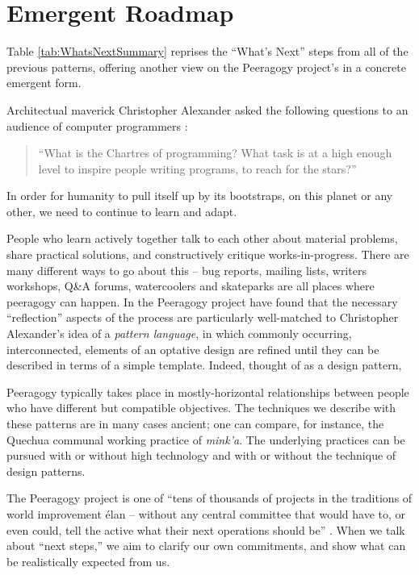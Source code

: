 \section{Emergent Roadmap} \label{sec:Distributed_Roadmap}

Table \ref{tab:WhatsNextSummary} reprises the ``What's Next'' steps from all of the previous
patterns, offering another view on the Peeragogy project's
 in a concrete emergent form.

Architectual maverick Christopher Alexander asked the following questions to an audience of computer programmers \cite{alexander1999origins}: 
\begin{quote}
``What is the Chartres of programming? What task is at a high enough level to inspire people writing programs, to reach for the stars?''
\end{quote}
In order for humanity to pull itself up by its bootstraps, on this planet or any other, we need to continue to learn and adapt.

People who learn actively together talk to each other about material problems, share practical solutions, and constructively critique works-in-progress.  There are many different ways to go about this -- bug reports, mailing lists, writers workshops, Q\&A forums, watercoolers and skateparks are all places where peeragogy can happen.  In the Peeragogy project have found that the necessary ``reflection'' aspects of the process are particularly well-matched to Christopher Alexander's idea of a \emph{pattern language}, in which commonly occurring,  interconnected, elements of an optative design are refined until they can be described in terms of a simple template.  Indeed, thought of as a design pattern, 

Peeragogy typically takes place in mostly-horizontal relationships between people who have different but compatible objectives.  The techniques we describe with these patterns are in many cases ancient; one can compare, for instance, the Quechua communal working practice of \emph{mink'a}.  The underlying practices can be pursued with or without high technology and with or without the technique of design patterns.

The Peeragogy project is one of ``tens of thousands of projects in the traditions of world improvement \'elan -- without any central committee that would have to, or even could, tell the active what their next operations should be'' \cite[p. 402]{sloterdijk2013change}.  When we talk about ``next steps,'' we aim to clarify our own commitments, and show what can be realistically expected from us.  

